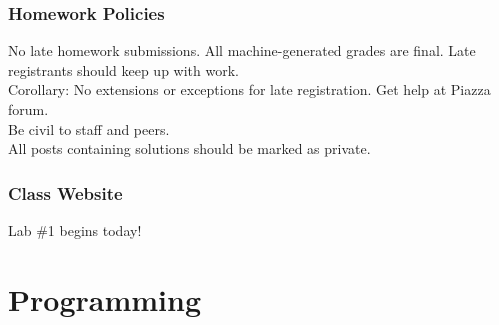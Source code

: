 \documentclass[11pt]{beamer}
\begin{document}
\begin{frame}
  \frametitle{Homework Policies}
  \Enlarge

  \begin{itemize}
    \myitem No late homework submissions. %
    \myitem All machine-generated grades are final. %
    \myitem Late registrants should keep up with work. \\ \textcolor{CS101GradBot}{\footnotesize\hspace{1em} Corollary:  No extensions or exceptions for late registration.} %
    \myitem Get help at Piazza forum. \\ \textcolor{CS101GradBot}{\footnotesize\hspace{1em} Be civil to staff and peers. \\ All posts containing solutions should be marked as private.}
  \end{itemize}
\end{frame}

\begin{frame}[plain,c]
  \frametitle{Class Website}
  \Enlarge

  \begin{center}
    \textcolor{CS101Base}{\Huge Lab \#1 begins today!}
  \end{center}
\end{frame}

\section{Programming}
\end{document}
